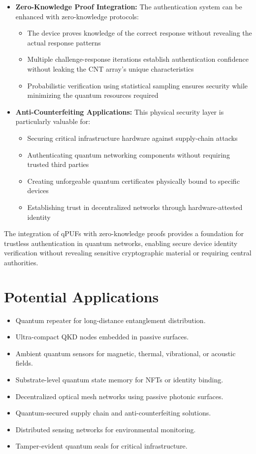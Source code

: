\documentclass[11pt]{article}
\begin{document}
\begin{itemize}
		\item \textbf{Zero-Knowledge Proof Integration:} The authentication system can be enhanced with zero-knowledge protocols:
		\begin{itemize}
			\item The device proves knowledge of the correct response without revealing the actual response patterns
			\item Multiple challenge-response iterations establish authentication confidence without leaking the CNT array's unique characteristics
			\item Probabilistic verification using statistical sampling ensures security while minimizing the quantum resources required
		\end{itemize}
		
		\item \textbf{Anti-Counterfeiting Applications:} This physical security layer is particularly valuable for:
		\begin{itemize}
			\item Securing critical infrastructure hardware against supply-chain attacks
			\item Authenticating quantum networking components without requiring trusted third parties
			\item Creating unforgeable quantum certificates physically bound to specific devices
			\item Establishing trust in decentralized networks through hardware-attested identity
		\end{itemize}
	\end{itemize}
	
	The integration of qPUFs with zero-knowledge proofs provides a foundation for trustless authentication in quantum networks, enabling secure device identity verification without revealing sensitive cryptographic material or requiring central authorities.
	
	\section{Potential Applications}
	\begin{itemize}
		\item Quantum repeater for long-distance entanglement distribution.
		\item Ultra-compact QKD nodes embedded in passive surfaces.
		\item Ambient quantum sensors for magnetic, thermal, vibrational, or acoustic fields.
		\item Substrate-level quantum state memory for NFTs or identity binding.
		\item Decentralized optical mesh networks using passive photonic surfaces.
		\item Quantum-secured supply chain and anti-counterfeiting solutions.
		\item Distributed sensing networks for environmental monitoring.
		\item Tamper-evident quantum seals for critical infrastructure.
	\end{itemize}
	
\end{document}
